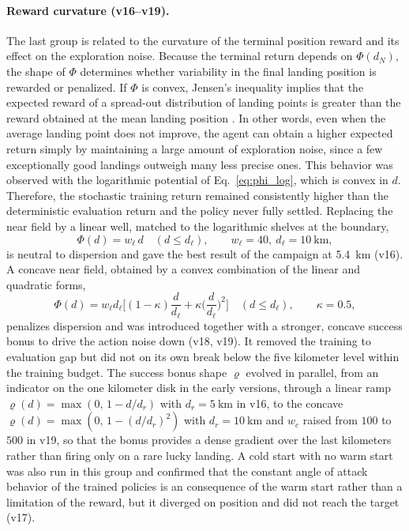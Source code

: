 \documentclass[11pt]{article}
\begin{document}
\paragraph{Reward curvature (v16--v19).}  The last group is related to the curvature of the terminal position reward and its effect on the exploration noise. Because the terminal return depends on $\Phi(d_N)$, the shape of $\Phi$ determines whether variability in the final landing position is rewarded or penalized. If $\Phi$ is convex, Jensen's inequality implies that the expected reward of a spread-out distribution of landing points is greater than the reward obtained at the mean landing position \cite{boyd2004convex}. In other words, even when the average landing point does not improve, the agent can obtain a higher expected return simply by maintaining a large amount of exploration noise, since a few exceptionally good landings outweigh many less precise ones. This behavior was observed with the logarithmic potential of Eq.~\eqref{eq:phi_log}, which is convex in $d$. Therefore, the stochastic training return remained consistently higher than the deterministic evaluation return and the policy never fully settled. Replacing the near field by a linear well, matched to the logarithmic shelves at the boundary,
\begin{equation}
\Phi(d) = w_\ell\, d \quad (d \le d_\ell), \qquad w_\ell = 40,\ d_\ell = \SI{10}{\kilo\meter},
\label{eq:phi_lin}
\end{equation}
is neutral to dispersion and gave the best result of the campaign at \SI{5.4}{\kilo\meter} (v16). A concave near field, obtained by a convex combination of the linear and quadratic forms,
\begin{equation}
\Phi(d) = w_\ell d_\ell\Big[(1-\kappa)\frac{d}{d_\ell} + \kappa\Big(\frac{d}{d_\ell}\Big)^{2}\Big] \quad (d \le d_\ell), \qquad \kappa = 0.5,
\label{eq:phi_convex}
\end{equation}
penalizes dispersion and was introduced together with a stronger, concave success bonus to drive the action noise down (v18, v19). It removed the training to evaluation gap but did not on its own break below the five kilometer level within the training budget. The success bonus shape $\varrho$ evolved in parallel, from an indicator on the one kilometer disk in the early versions, through a linear ramp $\varrho(d)=\max(0,\,1-d/d_r)$ with $d_r=\SI{5}{\kilo\meter}$ in v16, to the concave $\varrho(d)=\max(0,\,1-(d/d_r)^2)$ with $d_r=\SI{10}{\kilo\meter}$ and $w_c$ raised from $100$ to $500$ in v19, so that the bonus provides a dense gradient over the last kilometers rather than firing only on a rare lucky landing. A cold start with no warm start was also run in this group and confirmed that the constant angle of attack behavior of the trained policies is an consequence of the warm start rather than a limitation of the reward, but it diverged on position and did not reach the target (v17).
\end{document}
